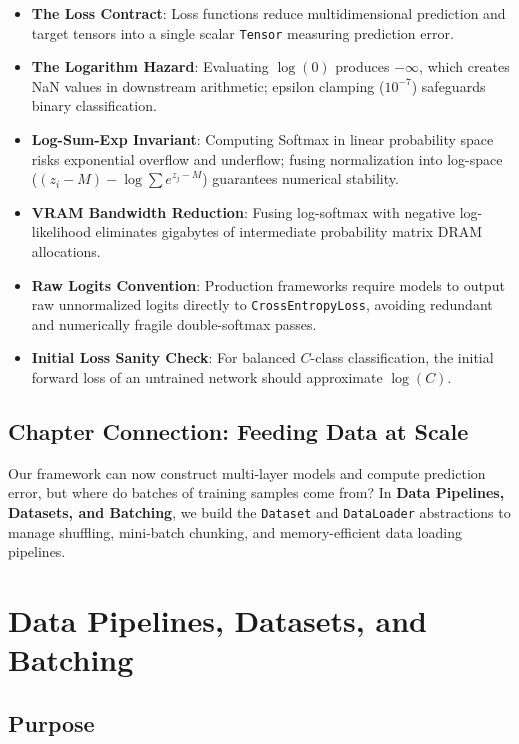 \documentclass[
  letterpaper,
]{scrbook}
\providecommand{\tightlist}{%
  \setlength{\itemsep}{0pt}\setlength{\parskip}{0pt}}
\begin{document}
\begin{itemize}
\tightlist
\item
  \textbf{The Loss Contract}: Loss functions reduce multidimensional
  prediction and target tensors into a single scalar \texttt{Tensor}
  measuring prediction error.
\item
  \textbf{The Logarithm Hazard}: Evaluating \(\log(0)\) produces
  \(-\infty\), which creates NaN values in downstream arithmetic;
  epsilon clamping (\(10^{-7}\)) safeguards binary classification.
\item
  \textbf{Log-Sum-Exp Invariant}: Computing Softmax in linear
  probability space risks exponential overflow and underflow; fusing
  normalization into log-space (\((z_i - M) - \log\sum e^{z_j - M}\))
  guarantees numerical stability.
\item
  \textbf{VRAM Bandwidth Reduction}: Fusing log-softmax with negative
  log-likelihood eliminates gigabytes of intermediate probability matrix
  DRAM allocations.
\item
  \textbf{Raw Logits Convention}: Production frameworks require models
  to output raw unnormalized logits directly to
  \texttt{CrossEntropyLoss}, avoiding redundant and numerically fragile
  double-softmax passes.
\item
  \textbf{Initial Loss Sanity Check}: For balanced \(C\)-class
  classification, the initial forward loss of an untrained network
  should approximate \(\log(C)\).
\end{itemize}

\section{Chapter Connection: Feeding Data at
Scale}\label{chapter-connection-feeding-data-at-scale}

Our framework can now construct multi-layer models and compute
prediction error, but where do batches of training samples come from? In
\textbf{Data Pipelines, Datasets, and Batching}, we build the
\texttt{Dataset} and \texttt{DataLoader} abstractions to manage
shuffling, mini-batch chunking, and memory-efficient data loading
pipelines.

\chapter{Data Pipelines, Datasets, and
Batching}\label{data-pipelines-datasets-and-batching}

\section*{Purpose}\label{purpose-5}
\end{document}
